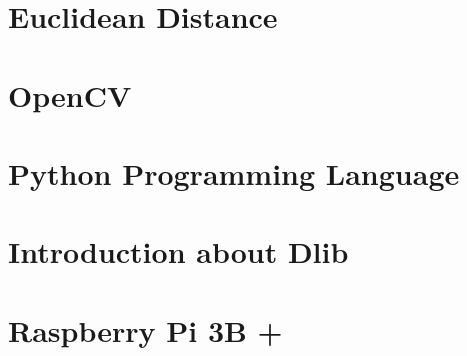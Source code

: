 \section{Euclidean Distance}

\section{OpenCV}

\section{Python Programming Language}

\section{Introduction about Dlib}

\section{Raspberry Pi 3B +}